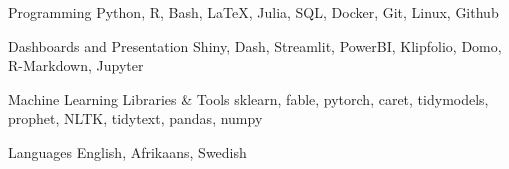 

\begin{cvskills}

  \cvskill
    {Programming} %
    {Python, R, Bash, \LaTeX, Julia, SQL, Docker, Git, Linux, Github} %

  \cvskill
    {Dashboards and Presentation} %
    {Shiny, Dash, Streamlit, PowerBI, Klipfolio, Domo, R-Markdown, Jupyter} %

  \cvskill
    {Machine Learning Libraries \& Tools} %
    {sklearn, fable, pytorch, caret, tidymodels, prophet, NLTK, tidytext, pandas, numpy} %

  \cvskill
    {Languages} %
    {English, Afrikaans, Swedish} %

\end{cvskills}
